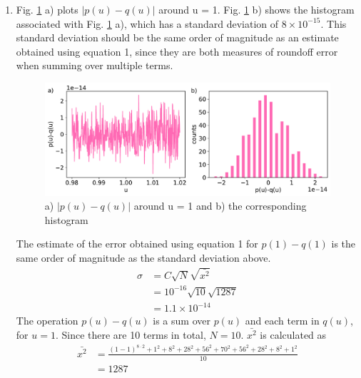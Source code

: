 \documentclass{article}
\begin{document}
\begin{enumerate}
\begin{enumerate}
    \item Fig. \ref{fig:3b} a) plots $|p(u)-q(u)|$ around u = 1. Fig. \ref{fig:3b} b) shows the histogram associated with Fig. \ref{fig:3b} a), which has a standard deviation of $8\times10^{-15}$. This standard deviation should be the same order of magnitude as an estimate obtained using equation 1, since they are both measures of roundoff error when summing over multiple terms.

    \begin{figure}[h]
        \centering 
        \includegraphics[width=\textwidth]{3b.pdf}
        \caption{a) $|p(u)-q(u)|$ around u = 1 and b) the corresponding histogram}
        \label{fig:3b}
    \end{figure}

    The estimate of the error obtained using equation 1 for $p(1)-q(1)$ is the same order of magnitude as the standard deviation above.
    \begin{align*}
        \sigma &= C\sqrt{N}\sqrt{\bar{x^2}}\\
        &= 10^{-16}\sqrt{10}\sqrt{1287}\\
        &= 1.1 \times 10^{-14}
    \end{align*}
    The operation $p(u)-q(u)$ is a sum over $p(u)$ and each term in $q(u)$, for $u=1$. Since there are 10 terms in total, $N=10$. $\bar{x^2}$ is calculated as 
    \begin{align*}
        \bar{x^2} &= \frac{(1-1)^{8\cdot 2} + 1^2 + 8^2 + 28^2 + 56^2 + 70^2 + 56^2 +28^2 + 8^2+ 1^2}{10}\\
        &= 1287
    \end{align*}
    

\end{enumerate}
\end{enumerate}
\end{document}
